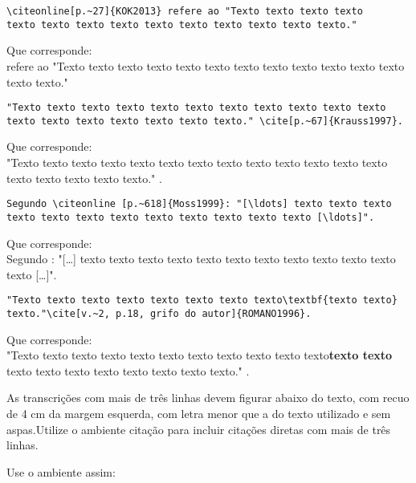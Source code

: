 \begin{alineas} 
\item 
\begin{verbatim}
\citeonline[p.~27]{KOK2013} refere ao "Texto texto texto texto 
texto texto texto texto texto texto texto texto texto texto."
\end{verbatim}
Que corresponde: \\
 refere ao "Texto texto texto texto texto texto texto texto texto texto texto texto texto texto."
\item 
\begin{verbatim}
"Texto texto texto texto texto texto texto texto texto texto texto 
texto texto texto texto texto texto texto." \cite[p.~67]{Krauss1997}.
\end{verbatim}
Que corresponde: \\
"Texto texto texto texto texto texto texto texto texto texto texto texto texto texto texto texto texto texto." \cite[p.~67]{Krauss1997}.

\item 
\begin{verbatim}
Segundo \citeonline [p.~618]{Moss1999}: "[\ldots] texto texto texto 
texto texto texto texto texto texto texto texto texto [\ldots]".
\end{verbatim}
Que corresponde: \\
Segundo : "[\ldots] texto texto texto texto texto texto texto texto texto texto texto texto [\ldots]".

\item 
\begin{verbatim}
"Texto texto texto texto texto texto texto texto\textbf{texto texto}
texto."\cite[v.~2, p.18, grifo do autor]{ROMANO1996}. 
\end{verbatim}
Que corresponde: \\
"Texto texto texto texto texto texto texto texto texto texto texto\textbf{texto texto} texto texto texto texto texto texto texto texto." \cite[v.~2, p.18, grifo do autor]{ROMANO1996}. 

\end{alineas}

As transcrições com mais de três linhas devem figurar abaixo do texto, com recuo de 4 cm da margem esquerda, com letra menor que a do texto utilizado e sem aspas.Utilize o ambiente citação para incluir citações diretas com mais de três linhas.

Use o ambiente assim: 

